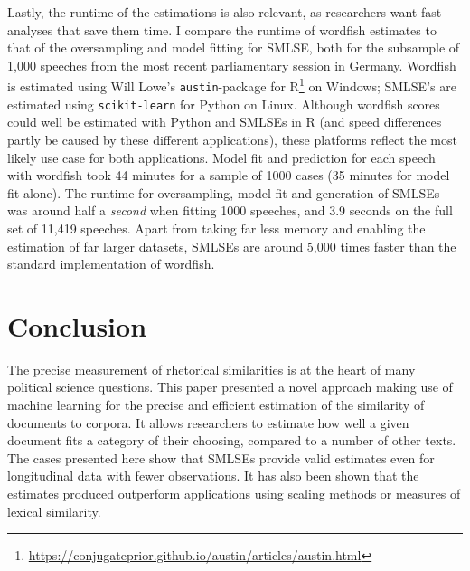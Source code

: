 \documentclass{article}
\begin{document}
Lastly, the runtime of the estimations is also relevant, as researchers want fast analyses that save them time. I compare the runtime of wordfish estimates to that of the oversampling and model fitting for SMLSE, both for the subsample of 1,000 speeches from the most recent parliamentary session in Germany. Wordfish is estimated using Will Lowe's \texttt{austin}-package for R\footnote{\url{https://conjugateprior.github.io/austin/articles/austin.html}} on Windows; SMLSE's are estimated using \texttt{scikit-learn} for Python on Linux. Although wordfish scores could well be estimated with Python and SMLSEs in R (and speed differences partly be caused by these different applications), these platforms reflect the most likely use case for both applications. Model fit and prediction for each speech with wordfish took 44 minutes for a sample of 1000 cases (35 minutes for model fit alone). The runtime for oversampling, model fit and generation of SMLSEs was around half a \textit{second} when fitting 1000 speeches, and 3.9 seconds on the full set of 11,419 speeches. Apart from taking far less memory and enabling the estimation of far larger datasets, SMLSEs are around  5,000 times faster than the standard implementation of wordfish.


\section{Conclusion}

The precise measurement of rhetorical similarities is at the heart of many political science questions. This paper presented a novel approach making use of machine learning for the precise and efficient estimation of the similarity of documents to corpora. It allows researchers to estimate how well a given document fits a category of their choosing, compared to a number of other texts. The cases presented here show that SMLSEs provide valid estimates even for longitudinal data with fewer observations. It has also been shown that the estimates produced outperform applications using scaling methods or measures of lexical similarity. \par
\end{document}
